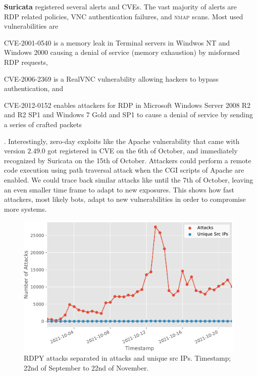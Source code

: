 \textbf{Suricata} registered several alerts and CVEs.
The vast majority of alerts are RDP related policies, VNC authentication failures, and \textsc{nmap} scans.
Most used vulnerabilities are 
\begin{enumerate*}[label=(\roman*)]
    \item CVE-2001-0540\cite{CVE-2001-0540} is a memory leak in Terminal servers in Windwos NT and Windows 2000 causing a denial of service (memory exhaustion) by misformed RDP requests,
    \item CVE-2006-2369\cite{CVE-2006-2369} is a RealVNC vulnerability allowing hackers to bypass authentication, and
    \item CVE-2012-0152\cite{CVE-2012-0152} enables attackers for RDP in Microsoft Windows Server 2008 R2 and R2 SP1 and Windows 7 Gold and SP1 to cause a denial of service by sending a series of crafted packets
\end{enumerate*}.
Interestingly, zero-day exploits like the Apache vulnerability \cite{CVE-2021-42013} that came with version $2.49.0$ got registered in CVE on the 6th of October, and immediately recognized by Suricata on the 15th of October.
Attackers could perform a remote code execution using path traversal attack when the CGI scripts of Apache are enabled.
We could trace back similar attacks like  until the 7th of October, leaving an even smaller time frame to adapt to new exposures.
This shows how fast attackers, most likely bots, adapt to new vulnerabilities in order to compromise more systems.

\begin{figure}[ht]
    \centering
    \includegraphics[width=\textwidth]{figures/tpot-rdpy-port.pdf}
    \caption[RDPY results of T-Pot]{RDPY attacks separated in attacks and unique src IPs. Timestamp; 22nd of September to 22nd of November.}
    \label{fig:rdpy-results}
\end{figure}

